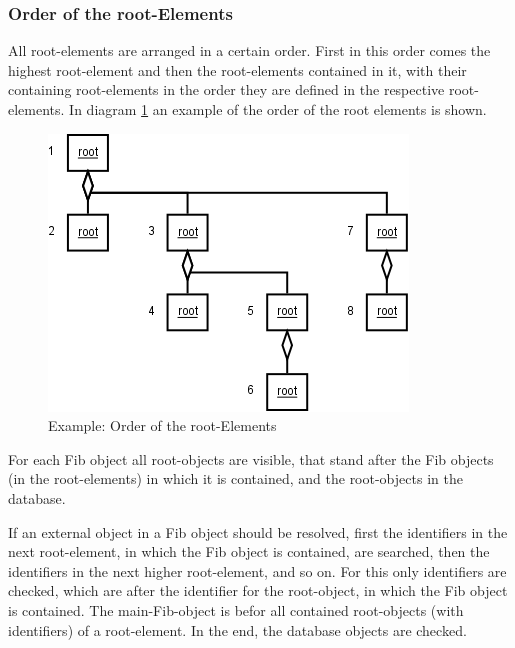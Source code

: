 \subsubsection{Order of the root-Elements}
\label{secRootOrder}

All root-elements are arranged in a certain order. First in this order comes the highest root-element and then the root-elements contained in it, with their containing root-elements in the order they are defined in the respective root-elements. In diagram \ref{figOrderRoot} an example of the order of the root elements is shown.

\begin{figure}[htbp]
\begin{center}
  \includegraphics[scale=0.4]{order_root}
\end{center}
\caption{Example: Order of the root-Elements}
\label{figOrderRoot}
\end{figure}

For each Fib object all root-objects are visible, that stand after the Fib objects (in the root-elements) in which it is contained, and the root-objects in the database.

If an external object  in a Fib object should be resolved, first the identifiers in the next root-element, in which the Fib object is contained, are searched, then the identifiers in the next higher root-element, and so on. For this only identifiers are checked, which are after the identifier for the root-object, in which the Fib object is contained. The main-Fib-object is befor all contained root-objects (with identifiers) of a root-element. In the end, the database objects are checked.

